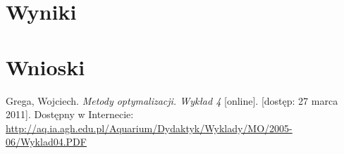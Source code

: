 \documentclass{classrep}
\begin{document}
\section{Wyniki}

\section{Wnioski}

\begin{thebibliography}{99}
Grega, Wojciech. \textit{Metody optymalizacji. Wykład 4} [online]. [dostęp: 27
marca 2011]. Dostępny w Internecie:
\url{http://aq.ia.agh.edu.pl/Aquarium/Dydaktyk/Wyklady/MO/2005-06/Wyklad04.PDF}
\end{thebibliography}
\end{document}
